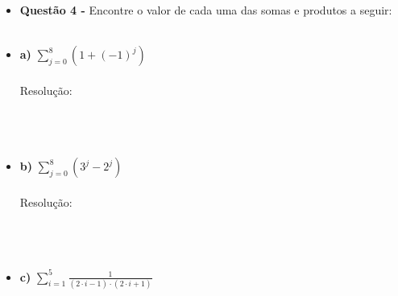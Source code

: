 \documentclass[a4paper,12pt]{article}
\begin{document}
\begin{itemize}
    
    
    \\\\
    \\\\
    \textbf{b)} $1\cdot 1! + 2\cdot 2! + ... + n\cdot n!$
    \\\\Resolução:
    \\\\
    \\\\
    \textbf{c)} $1 + \frac{1}{\sqrt{2}} + \frac{1}{\sqrt{3}} + \frac{1}{2} + \frac{1}{\sqrt{5}} + ... + \frac{1}{\sqrt{n}}$
    \\\\Resolução:
    \\\\
    \\\\
    \textbf{d)} $\frac{3}{2} + \frac{3}{4} + \frac{3}{8} + \frac{3}{16} + ... + \frac{3}{2^n}$
    \\\\Resolução:
    \\\\
    \\\\
    \textbf{e)} $\frac{1}{3} + \frac{1}{9} + \frac{1}{27} + \frac{1}{81} + \frac{1}{243} + ... + \frac{1}{3^n}$
    \\\\Resolução:
    \\\\
    \\\\
    \item[] \textbf{Questão 4 -} Encontre o valor de cada uma das somas e produtos a seguir:
    \\\
    \item[] \textbf{a)} $\sum\limits_{j=0}^8 (1 + (-1)^j)$
    \\\\Resolução:
    \\\\
    \\\\\item[] \textbf{b)} $\sum\limits_{j=0}^8 (3^j - 2^j)$
    \\\\Resolução:
    \\\\
    \\\\\item[] \textbf{c)} $\sum\limits_{i=1}^5 \frac{1}{(2\cdot i - 1)\cdot (2\cdot i + 1)}$

\end{itemize}
\end{document}
